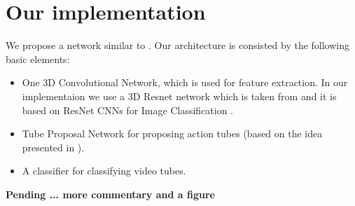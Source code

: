 \section{Our implementation}
We propose a network similar to \cite{DBLP:journals/corr/HouCS17}. Our architecture is consisted by the following basic elements:
\begin{itemize}
\item One 3D Convolutional Network, which is used for feature extraction. In our implementaion we use a 3D Resnet network which is taken from
  \cite{hara3dcnns} and it is based on ResNet CNNs for Image Classification \cite{DBLP:journals/corr/HeZRS15}.
\item Tube Proposal Network for proposing action tubes (based on the idea presented in \cite{DBLP:journals/corr/HouCS17}).
\item A classifier for classifying video tubes.
\end{itemize}

\textbf{Pending ... more commentary and a figure}


% 